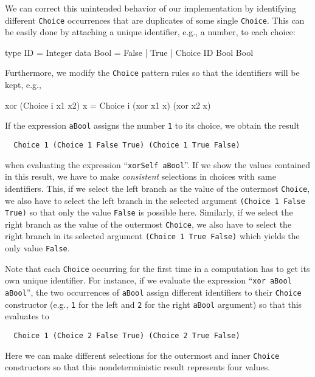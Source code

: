 \documentclass{llncs}
\newcommand{\code}[1]{\mbox{\small\texttt{#1}}}
\newcommand{\ccode}[1]{``\code{#1}''}
\begin{document}
We can correct this unintended behavior of our implementation
by identifying different \code{Choice} occurrences that are duplicates
of some single \code{Choice}. This can be easily done by attaching
a unique identifier, e.g., a number, to each choice:
\begin{haskell}
  type ID = Integer
  data Bool = False | True | Choice ID Bool Bool
\end{haskell}
Furthermore, we modify the \code{Choice} pattern rules so that
the identifiers will be kept, e.g.,
\begin{curry}
  xor (Choice i x1 x2) x = Choice i (xor x1 x) (xor x2 x)
\end{curry}
If the expression \code{aBool} assigns the number \code{1}
to its choice, we obtain the result
\begin{lstlisting}
  Choice 1 (Choice 1 False True) (Choice 1 True False)
\end{lstlisting}
when evaluating the expression \ccode{xorSelf aBool}.
If we show the values contained in this result,
we have to make \emph{consistent} selections in choices with
same identifiers. This, if we select the left branch as the value
of the outermost \code{Choice}, we also have to select the left branch
in the selected argument \code{(Choice 1 False True)} so that only
the value \code{False} is possible here.
Similarly, if we select the right branch as the value of the outermost
\code{Choice}, we also have to select the right branch in
its selected argument \code{(Choice 1 True False)} which yields the only
value \code{False}.

Note that each \code{Choice} occurring for the first time in a computation
has to get its own unique identifier.
For instance, if we evaluate the expression \ccode{xor aBool aBool},
the two occurrences of \code{aBool} assign different identifiers
to their \code{Choice} constructor (e.g., \code{1} for the left
and \code{2} for the right \code{aBool} argument) so that this evaluates to
\begin{lstlisting}
  Choice 1 (Choice 2 False True) (Choice 2 True False)
\end{lstlisting}
Here we can make different selections for the outermost and inner
\code{Choice} constructors so that this nondeterministic result represents
four values.
\end{document}
